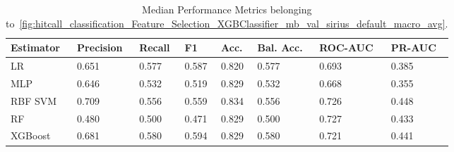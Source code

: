 \begin{longtable}{llllllll}
\caption{Median Performance Metrics belonging to~\ref{fig:hitcall_classification_Feature_Selection_XGBClassifier_mb_val_sirius_default_macro_avg}.}\label{tab:table:hitcall_classification_feature_selection_xgbclassifier_mb_val_sirius_default_macro_avg}\\
\toprule
\midrule
\small Estimator & \small Precision & \small Recall & \small F1 & \small Acc. & \small Bal. Acc. & \small ROC-AUC & \small PR-AUC\\
\hline
LR & 0.651 & 0.577 & 0.587 & 0.820 & 0.577 & 0.693 & 0.385\\
MLP & 0.646 & 0.532 & 0.519 & 0.829 & 0.532 & 0.668 & 0.355\\
RBF SVM & 0.709 & 0.556 & 0.559 & 0.834 & 0.556 & 0.726 & 0.448\\
RF & 0.480 & 0.500 & 0.471 & 0.829 & 0.500 & 0.727 & 0.433\\
XGBoost & 0.681 & 0.580 & 0.594 & 0.829 & 0.580 & 0.721 & 0.441\\
\bottomrule
\end{longtable}